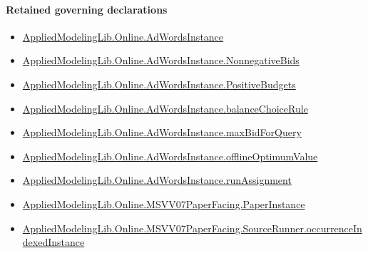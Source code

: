 \documentclass[10pt]{article}
\begin{document}
\paragraph{Retained governing declarations}
\begin{itemize}\raggedright
\item \hyperlink{governing-declaration-e5ce49672bf26ab1}{Applied\allowbreak{}Modeling\allowbreak{}Lib.\allowbreak{}Online.\allowbreak{}Ad\allowbreak{}Words\allowbreak{}Instance}
\item \hyperlink{governing-declaration-7bed8c5ff5e5cde7}{Applied\allowbreak{}Modeling\allowbreak{}Lib.\allowbreak{}Online.\allowbreak{}Ad\allowbreak{}Words\allowbreak{}Instance.\allowbreak{}Nonnegative\allowbreak{}Bids}
\item \hyperlink{governing-declaration-eabdcef9dca00922}{Applied\allowbreak{}Modeling\allowbreak{}Lib.\allowbreak{}Online.\allowbreak{}Ad\allowbreak{}Words\allowbreak{}Instance.\allowbreak{}Positive\allowbreak{}Budgets}
\item \hyperlink{governing-declaration-47ab5f144ca5a666}{Applied\allowbreak{}Modeling\allowbreak{}Lib.\allowbreak{}Online.\allowbreak{}Ad\allowbreak{}Words\allowbreak{}Instance.\allowbreak{}balance\allowbreak{}Choice\allowbreak{}Rule}
\item \hyperlink{governing-declaration-af1b7d959c110360}{Applied\allowbreak{}Modeling\allowbreak{}Lib.\allowbreak{}Online.\allowbreak{}Ad\allowbreak{}Words\allowbreak{}Instance.\allowbreak{}max\allowbreak{}Bid\allowbreak{}For\allowbreak{}Query}
\item \hyperlink{governing-declaration-421b6f6fda18a867}{Applied\allowbreak{}Modeling\allowbreak{}Lib.\allowbreak{}Online.\allowbreak{}Ad\allowbreak{}Words\allowbreak{}Instance.\allowbreak{}offline\allowbreak{}Optimum\allowbreak{}Value}
\item \hyperlink{governing-declaration-1878a8a2b3e3182d}{Applied\allowbreak{}Modeling\allowbreak{}Lib.\allowbreak{}Online.\allowbreak{}Ad\allowbreak{}Words\allowbreak{}Instance.\allowbreak{}run\allowbreak{}Assignment}
\item \hyperlink{governing-declaration-11907576ec71eeb5}{Applied\allowbreak{}Modeling\allowbreak{}Lib.\allowbreak{}Online.\allowbreak{}MSVV07\allowbreak{}Paper\allowbreak{}Facing.\allowbreak{}Paper\allowbreak{}Instance}
\item \hyperlink{governing-declaration-15d177ff0033a703}{Applied\allowbreak{}Modeling\allowbreak{}Lib.\allowbreak{}Online.\allowbreak{}MSVV07\allowbreak{}Paper\allowbreak{}Facing.\allowbreak{}Source\allowbreak{}Runner.\allowbreak{}occurrence\allowbreak{}Indexed\allowbreak{}Instance}

\end{itemize}
\end{document}
